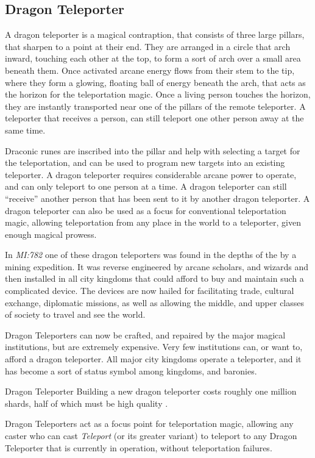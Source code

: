 \subsection{Dragon Teleporter}
\label{sec:Dragon Teleporter}

A dragon teleporter is a magical contraption, that consists of three large
pillars, that sharpen to a point at their end. They are arranged in a circle
that arch inward, touching each other at the top, to form a sort of arch over
a small area beneath them. Once activated arcane energy flows from their stem
to the tip, where they form a glowing, floating ball of energy beneath the
arch, that acts as the horizon for the teleportation magic. Once a living
person touches the horizon, they are instantly transported near one of the
pillars of the remote teleporter. A teleporter that receives a person, can
still teleport one other person away at the same time.

Draconic runes are inscribed into the pillar and help with selecting a target
for the teleportation, and can be used to program new targets into an existing
teleporter. A dragon teleporter requires considerable arcane power to operate,
and can only teleport to one person at a time. A dragon teleporter can still
``receive'' another person that has been sent to it by another dragon
teleporter. A dragon teleporter can also be used as a focus for conventional
teleportation magic, allowing teleportation from any place in the world to
a teleporter, given enough magical prowess.

In \emph{MI:782} one of these dragon teleporters was found in the depths of
the  by a mining expedition. It was reverse
engineered by arcane scholars, and wizards and then installed in all city
kingdoms that could afford to buy and maintain such a complicated device.
The devices are now hailed for facilitating trade, cultural exchange,
diplomatic missions, as well as allowing the middle, and upper classes of
society to travel and see the world.

Dragon Teleporters can now be crafted, and repaired by the major magical
institutions, but are extremely expensive. Very few institutions can, or want
to, afford a dragon teleporter. All major city kingdoms operate a teleporter,
and it has become a sort of status symbol among kingdoms, and baronies.

\begin{35e}{Dragon Teleporter}
  Building a new dragon teleporter costs roughly one million shards, half of
  which must be high quality .

  Dragon Teleporters act as a focus point for teleportation magic, allowing
  any caster who can cast \emph{Teleport} (or its greater variant) to teleport
  to any Dragon Teleporter that is currently in operation, without
  teleportation failures.
\end{35e}
